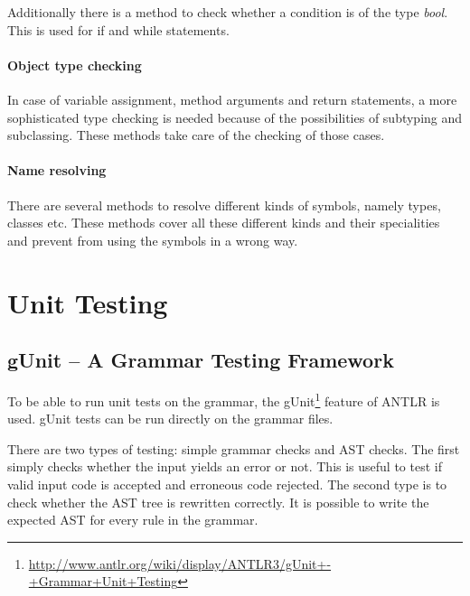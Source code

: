 Additionally there is a method to check whether a condition is of
the type \emph{bool}. This is used for if and while statements.

\paragraph{Object type checking}
In case of variable assignment, method arguments and return statements,
a more sophisticated type checking is needed because of the possibilities
of subtyping and subclassing. These methods take care of the checking
of those cases.

\paragraph{Name resolving}
There are several methods to resolve different kinds of symbols, namely
types, classes etc. These methods cover all these different kinds and their
specialities and prevent from using the symbols in a wrong way.

%
%

\section{Unit Testing}
\subsection{gUnit -- A Grammar Testing Framework}

To be able to run unit tests on the grammar, the gUnit\footnote{
\href{http://www.antlr.org/wiki/display/ANTLR3/gUnit+-+Grammar+Unit+Testing}
{http://www.antlr.org/wiki/display/ANTLR3/gUnit+-+Grammar+Unit+Testing}}
feature of ANTLR is used. gUnit tests can be run directly on the grammar files.

There are two types of testing: simple grammar checks and AST checks. The
first simply checks whether the input yields an error or not. This is useful
to test if valid input code is accepted and erroneous code rejected. The
second type is to check whether the AST tree is rewritten correctly. It is
possible to write the expected AST for every rule in the grammar.\\

